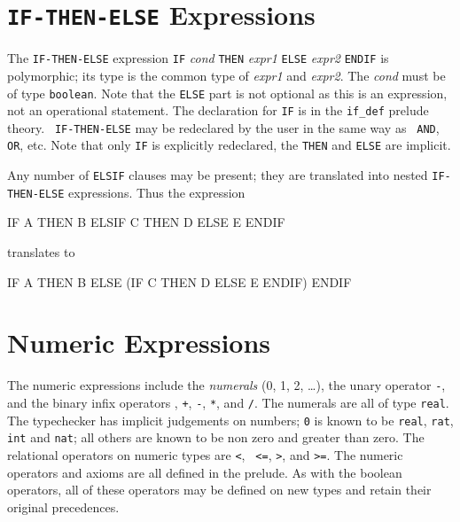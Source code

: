 

\section{\texttt{IF-THEN-ELSE} Expressions}

The \texttt{IF-THEN-ELSE} expression \texttt{IF} {\em cond\/} \texttt{THEN} {\em
expr1\/} \texttt{ELSE} {\em expr2\/} \texttt{ENDIF} is polymorphic; its type is the
common type of {\em expr1\/} and {\em expr2\/}.  The {\em cond\/} must
be of type \texttt{boolean}.  Note that the \texttt{ELSE} part is not
optional as this is an expression, not an operational statement.  The
declaration for \texttt{IF} is in the \texttt{if\_def} prelude theory.  \texttt{
IF-THEN-ELSE} may be redeclared by the user in the same way as \texttt{
AND}, \texttt{OR}, etc.  Note that only \texttt{IF} is explicitly redeclared,
the \texttt{THEN} and \texttt{ELSE} are implicit.

Any number of \texttt{ELSIF} clauses may be present; they are translated into nested
\texttt{IF-THEN-ELSE} expressions.  Thus the expression
\begin{pvsex}
  IF A THEN B
  ELSIF C THEN D
  ELSE E
  ENDIF
\end{pvsex}
%
translates to
\begin{pvsex}
  IF A THEN B
  ELSE (IF C THEN D
        ELSE E
        ENDIF)
  ENDIF
\end{pvsex}

\section{Numeric Expressions}

The numeric expressions include the \emph{numerals} (0, 1,
2, \ldots), the unary operator \texttt{-}\index{-}, and the binary infix
operators \texttt{}\index{\^}, \texttt{+}\index{+},
\texttt{-}\index{-}, \texttt{*}\index{*}, and \texttt{/}\index{/}.  The
numerals are all of type \texttt{real}.
The typechecker has implicit judgements on numbers; \texttt{0} is known to
be \texttt{real}, \texttt{rat}, \texttt{int} and \texttt{nat}; all others
are known to be non zero and greater than zero.  The relational operators
on numeric types are \texttt{<}, \texttt{
<=}, \texttt{>}, and
\texttt{>=}.  The numeric operators and axioms are
all defined in the prelude.  As with the boolean operators, all of these
operators may be defined on new types and retain their original precedences.


